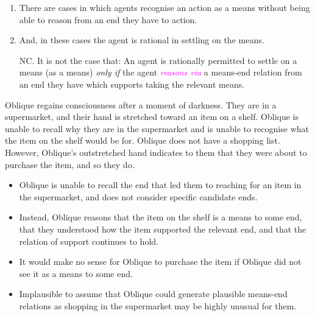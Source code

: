 \documentclass[10pt]{article}
\newcommand{\hozlinedash}[0]{%
  \noindent\hdashrule[0.5ex][c]{\textwidth}{.1pt}{2.5pt}
}
\begin{document}

\hozlinedash

\begin{enumerate}[label=N\arabic*., ref=(N\arabic*)]
\item There are cases in which agents recognise an action as a means without being able to reason from an end they have to action.
\item And, in these cases the agent is rational in settling on the means.
\item[NC.] It is not the case that:
  An agent is rationally permitted to settle on a means (as a means)  \emph{only if} the agent \textcolor{fuchsia}{\emph{reasons via}} a means-end relation from an end they have which supports taking the relevant means.
\end{enumerate}

\hozlinedash

\begin{scenario}[Supermarket]
  Oblique regains consciousness after a moment of darkness.
  They are in a supermarket, and their hand is stretched toward an item on a shelf.
  Oblique is unable to recall why they are in the supermarket and is unable to recognise what the item on the shelf would be for.
  Oblique does not have a shopping list.
  However, Oblique's outstretched hand indicates to them that they were about to purchase the item, and so they do.
\end{scenario}


\begin{itemize}
\item Oblique is unable to recall the end that led them to reaching for an item in the supermarket, and does not consider specific candidate ends.
\item Instead, Oblique reasons that the item on the shelf is a means to some end, that they understood how the item supported the relevant end, and that the relation of support continues to hold.
\item It would make no sense for Oblique to purchase the item if Oblique did not see it as a means to some end.
\item Implausible to assume that Oblique could generate plausible means-end relations as shopping in the supermarket may be highly unusual for them.
\end{itemize}




\hozlinedash
\end{document}
